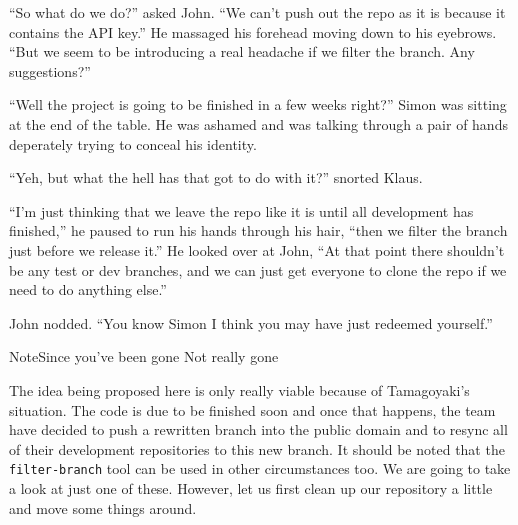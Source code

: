 \begin{trenches}
``So what do we do?'' asked John.
``We can't push out the repo as it is because it contains the API key.''
He massaged his forehead moving down to his eyebrows.
``But we seem to be introducing a real headache if we filter the branch. Any suggestions?''

``Well the project is going to be finished in a few weeks right?'' Simon was sitting at the end of the table.
He was ashamed and was talking through a pair of hands deperately trying to conceal his identity.

``Yeh, but what the hell has that got to do with it?'' snorted Klaus.

``I'm just thinking that we leave the repo like it is until all development has finished,'' he paused to run his hands through his hair,
``then we filter the branch just before we release it.''
He looked over at John, ``At that point there shouldn't be any test or dev branches, and we can just get everyone to clone the repo if we need to do anything else.''

John nodded.  ``You know Simon I think you may have just redeemed yourself.''
\end{trenches}

\begin{callout}{Note}{Since you've been gone}
Not really gone
\end{callout}

The idea being proposed here is only really viable because of Tamagoyaki's situation.
The code is due to be finished soon and once that happens, the team have decided to push a rewritten branch into the public domain and to resync all of their development repositories to this new branch.
It should be noted that the \texttt{filter-branch} tool can be used in other circumstances too.
We are going to take a look at just one of these.
However, let us first clean up our repository a little and move some things around.


